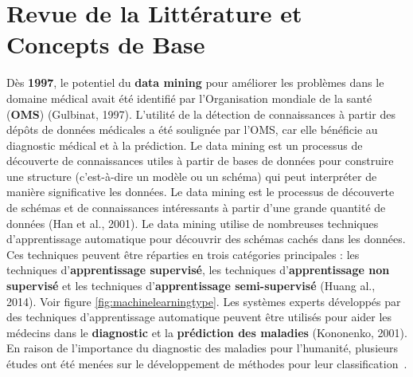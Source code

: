 \chapter{Revue de la Littérature et Concepts de Base}

Dès \textbf{1997}, le potentiel du \textbf{data mining} pour améliorer les problèmes dans le domaine médical avait été identifié par l'Organisation mondiale de la santé (\textbf{OMS}) (Gulbinat, 1997). L'utilité de la détection de connaissances à partir des dépôts de données médicales a été soulignée par l'OMS, car elle bénéficie au diagnostic médical et à la prédiction. Le data mining est un processus de découverte de connaissances utiles à partir de bases de données pour construire une structure (c'est-à-dire un modèle ou un schéma) qui peut interpréter de manière significative les données. Le data mining est le processus de découverte de schémas et de connaissances intéressants à partir d'une grande quantité de données (Han et al., 2001). Le data mining utilise de nombreuses techniques d'apprentissage automatique pour découvrir des schémas cachés dans les données. Ces techniques peuvent être réparties en trois catégories principales : les techniques d'\textbf{apprentissage supervisé}, les techniques d'\textbf{apprentissage non supervisé} et les techniques d'\textbf{apprentissage semi-supervisé} (Huang al., 2014). Voir figure \ref{fig:machinelearningtype}. Les systèmes experts développés par des techniques d'apprentissage automatique peuvent être utilisés pour aider les médecins dans le \textbf{diagnostic} et la \textbf{prédiction des maladies} (Kononenko, 2001). En raison de l'importance du diagnostic des maladies pour l'humanité, plusieurs études ont été menées sur le développement de méthodes pour leur classification~\cite{Analytical2017Meh}.

